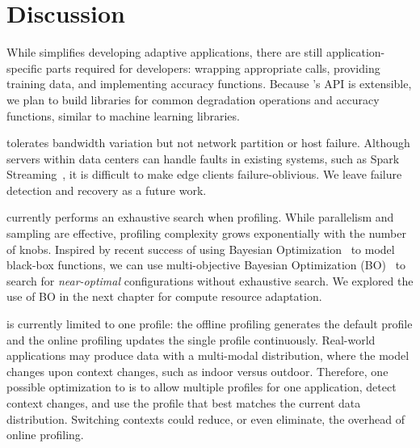 \section{Discussion}
\label{sec:awstream-discussion}

 While \awstream{} simplifies developing
adaptive applications, there are still application-specific parts required for
developers: wrapping appropriate \maybe{} calls, providing training data, and
implementing accuracy functions. Because \awstream{}'s API is extensible, we plan
to build libraries for common degradation operations and accuracy functions,
similar to machine learning libraries.

 \awstream{} tolerates bandwidth variation
but not network partition or host failure. Although servers within data centers
can handle faults in existing systems, such as Spark
Streaming~\cite{zaharia2013discretized}, it is difficult to make edge clients
failure-oblivious.  We leave failure detection and recovery as a future work.

 \awstream{} currently performs an exhaustive search
when profiling. While parallelism and sampling are effective, profiling
complexity grows exponentially with the number of knobs. Inspired by recent
success of using Bayesian Optimization~\cite{snoek2012practical,
  alipourfard2017cherrypick, solnik2017bayesian} to model black-box functions,
we can use multi-objective Bayesian Optimization
(BO)~\cite{hernandez2016predictive} to search for \textit{near-optimal}
configurations without exhaustive search. We explored the use of BO in the next
chapter for compute resource adaptation.


 \awstream{} is currently limited to one profile: the
offline profiling generates the default profile and the online profiling
updates the single profile continuously.  Real-world applications may produce
data with a multi-modal distribution, where the model changes upon context
changes, such as indoor versus outdoor. Therefore, one possible optimization
to \awstream{} is to allow multiple profiles for one application, detect
context changes, and use the profile that best matches the current data
distribution.  Switching contexts could reduce, or even eliminate, the
overhead of online profiling.

